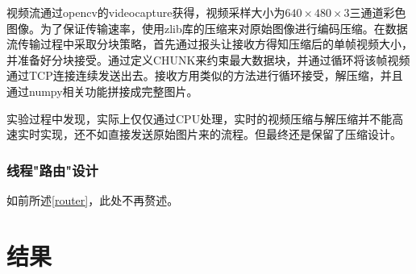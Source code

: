 \documentclass[UTF8]{ctexart}
\begin{document}
视频流通过opencv的videocapture获得，视频采样大小为$640\times480\times3$三通道彩色图像。为了保证传输速率，使用zlib库的压缩来对原始图像进行编码压缩。在数据流传输过程中采取分块策略，首先通过报头让接收方得知压缩后的单帧视频大小，并准备好分块接受。通过定义CHUNK来约束最大数据块，并通过循环将该帧视频通过TCP连接连续发送出去。接收方用类似的方法进行循环接受，解压缩，并且通过numpy相关功能拼接成完整图片。

实验过程中发现，实际上仅仅通过CPU处理，实时的视频压缩与解压缩并不能高速实时实现，还不如直接发送原始图片来的流程。但最终还是保留了压缩设计。
\subsubsection{线程"路由"设计}
如前所述\ref{router}，此处不再赘述。
\section{结果}
\end{document}

